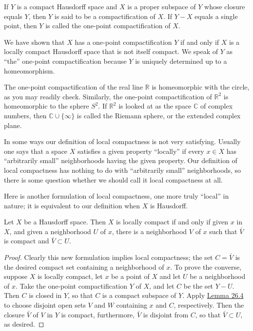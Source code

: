 \begin{definition}
 If \(Y\) is a compact Hausdorff space and \(X\) is a proper subspace of \(Y\) whose closure equals \(Y\), then \(Y\) is said to be a compactification of \(X\). If \(Y - X\) equals a single point, then \(Y\) is called the one-point compactification of \(X\).
\end{definition}

We have shown that \(X\) has a one-point compactification \(Y\) if and only if \(X\) is a locally compact Hausdorff space that is not itself compact. We speak of \(Y\) as ``the'' one-point compactification because \(Y\) is uniquely determined up to a homeomorphism.

\begin{centeredblock}
\begin{example}
\label{ex:\thesection.\theexample}
 The one-point compactification of the real line \(\mathbb{R}\) is homeomorphic with the circle, as you may readily check. Similarly, the one-point compactification of \(\mathbb{R}^{2}\) is homeomorphic to the sphere \(S^{2}\). If \(\mathbb{R}^{2}\) is looked at as the space \(\mathbb{C}\) of complex numbers, then \(\mathbb{C} \cup \{ \infty \}\) is called the Riemann sphere, or the extended complex plane.
\end{example}
\end{centeredblock}

In some ways our definition of local compactness is not very satisfying. Usually one says that a space \(X\) satisfies a given property ``locally'' if every \(x \in X\) has ``arbitrarily small'' neighborhoods having the given property. Our definition of local compactness has nothing to do with ``arbitrarily small'' neighborhoods, so there is some question whether we should call it local compactness at all.

Here is another formulation of local compactness, one more truly ``local'' in nature; it is equivalent to our definition when \(X\) is Hausdorff.

\begin{theorem}
\label{thm:\thetheorem}
 Let \(X\) be a Hausdorff space. Then \(X\) is locally compact if and only if given \(x\) in \(X\), and given a neighborhood \(U\) of \(x\), there is a neighborhood \(V\) of \(x\) such that \(\bar{V}\) is compact and \(\bar{V} \subset U\).

\end{theorem}
\begin{proof}
Clearly this new formulation implies local compactness; the set \(C = \bar{V}\) is the desired compact set containing a neighborhood of \(x\). To prove the converse, suppose \(X\) is locally compact, let \(x\) be a point of \(X\) and let \(U\) be a neighborhood of \(x\). Take the one-point compactification \(Y\) of \(X\), and let \(C\) be the set \(Y - U\). Then \(C\) is closed in \(Y\), so that \(C\) is a compact subspace of \(Y\). Apply \hyperref[lem:26.4]{Lemma 26.4} to choose disjoint open sets \(V\) and \(W\) containing \(x\) and \(C\), respectively. Then the closure \(\bar{V}\) of \(V\) in \(Y\) is compact, furthermore, \(\bar{V}\) is disjoint from \(C\), so that \(\bar{V} \subset U\), as desired.
\end{proof}

